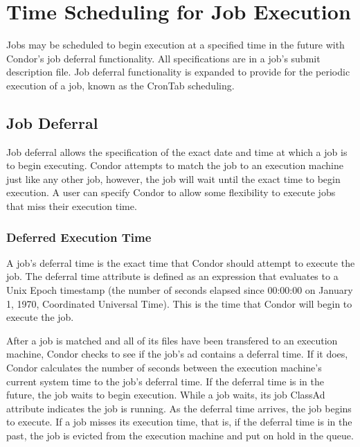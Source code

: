 \section{Time Scheduling for Job Execution}
\label{sec:Job-Executetime-Scheduling}

Jobs may be scheduled to begin execution at a specified time in the future
with Condor's job deferral functionality.
All specifications are in a job's submit description file.
Job deferral functionality is expanded to provide for the
periodic execution of a job, known as the CronTab scheduling.

\subsection{Job Deferral}
\label{sec:JobDeferral}

Job deferral allows the specification of
the exact date and time at which a job is to begin executing.
Condor attempts to match the job to an execution machine
just like any other job,
however, the job will wait until the exact time to begin execution.
A user can specify Condor to allow some flexibility to execute jobs
that miss their execution time.

\subsubsection{Deferred Execution Time}
\label{sec:JobDeferral-DeferralTime}

A job's deferral time is the exact time that Condor should attempt
to execute the job.
The deferral time attribute is defined as an expression
that evaluates to a Unix Epoch timestamp
(the number of seconds elapsed since 00:00:00 on January 1, 1970,
Coordinated Universal Time).
This is the time that Condor will begin to execute the job.

After a job is matched and all of its files have been transfered
to an execution machine,
Condor checks to see if the job's ad contains a deferral time.
If it does,
Condor calculates the number of seconds between the execution
machine's current system time to the job's deferral time.
If the deferral time is in the future,
the job waits to begin execution.
While a job waits,
its job ClassAd attribute  indicates the job
is running.
As the deferral time arrives, the job begins to execute.
If a job misses its execution time,
that is, if the deferral time is in the past,
the job is evicted from the execution machine and put on hold in the queue.

